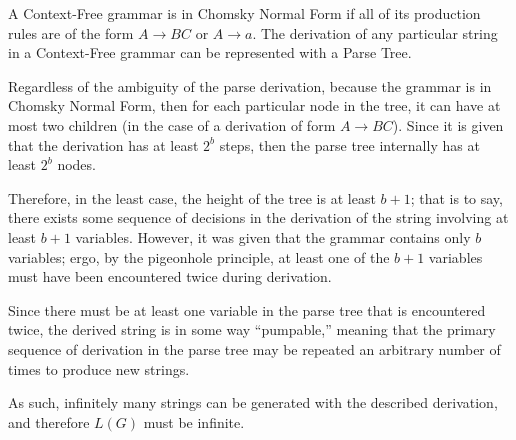 { \setlength\parindent{2em}
\indent A Context-Free grammar is in Chomsky Normal Form if all of its production rules are of the form $A \rightarrow BC$ or $A \rightarrow a$. The derivation of any particular string in a Context-Free grammar can be represented with a Parse Tree.

\indent Regardless of the ambiguity of the parse derivation, because the grammar is in Chomsky Normal Form, then for each particular node in the tree, it can have at most two children (in the case of a derivation of form $A \rightarrow BC$). Since it is given that the derivation has at least $2^b$ steps, then the parse tree internally has at least $2^b$ nodes.

\indent Therefore, in the least case, the height of the tree is at least $b+1$; that is to say, there exists some sequence of decisions in the derivation of the string involving at least $b+1$ variables. However, it was given that the grammar contains only $b$ variables; ergo, by the pigeonhole principle, at least one of the $b+1$ variables must have been encountered twice during derivation.

\indent Since there must be at least one variable in the parse tree that is encountered twice, the derived string is in some way ``pumpable,'' meaning that the primary sequence of derivation in the parse tree may be repeated an arbitrary number of times to produce new strings.

\indent As such, infinitely many strings can be generated with the described derivation, and therefore $L(G)$ must be infinite.}